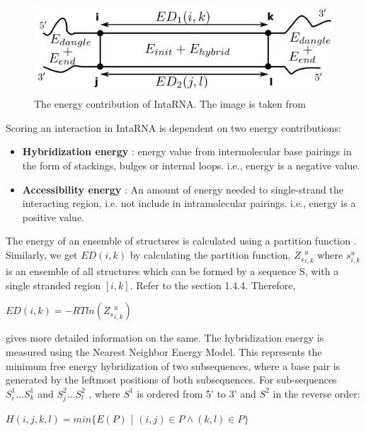 \documentclass[twoside,a4paper]{report}
\begin{document}
		\begin{figure}[tb]
		\includegraphics[width=0.6\linewidth]{inta}
		\centering
		\caption{ The energy contribution of IntaRNA. The image is taken from \citep{gelhausen2018constrained} } 
		\label{fig:inta}
	\end{figure}
	
	Scoring an interaction in IntaRNA is dependent on two energy contributions:\\
	
	\begin{itemize}
		\item \textbf{Hybridization energy} : energy value from intermolecular base pairings in the form of stackings, bulges or internal loops.  i.e., energy is a negative value. 
		\item \textbf{Accessibility energy} : An amount of energy needed to single-strand the interacting region, i.e. not include in intramolecular pairings. i.e., energy is a positive value. 
	\end{itemize}
	
	
	The energy of an ensemble of structures is calculated using a partition function \citep{mccaskill1990equilibrium} . Similarly, we get $ED(i,k)$ by calculating the partition function, ${Z_s}_{i,k}^{u}$ where $s_{i,k}^{u} $ is an ensemble of all structures which can be formed by a sequence S, with a single stranded region $[i,k]$. Refer to the section 1.4.4. Therefore,
	
		\begin{center}
		
		$ED(i,k) = - RTln({Z_s}_{i,k}^{u})$
		
	\end{center}
	


	\citep{muckstein2006thermodynamics} gives more detailed information on the same.
	The hybridization energy is measured using the Nearest Neighbor Energy Model. This represents the minimum free energy hybridization of two subsequences, where a base pair is generated by the leftmost positions of both subsequences.
	For sub-sequences $S_i^1...S_k^1$ and  $S_j^2...S_l^2$ , where $S^1$ is ordered from 5' to 3' and $S^2$ in the reverse order:

	
		\begin{center}
		
		$H(i,j,k,l) = min \{ E(P)$ | $(i, j) \in P \land (k,l) \in P \}$
		
	\end{center}
	
\end{document}
